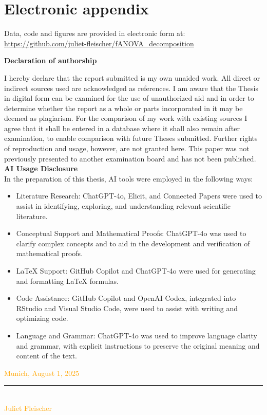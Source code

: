 \documentclass[12pt]{article}
\begin{document}
\section{Electronic appendix}
\label{el_app}

Data, code and figures are provided in electronic form at:\\
\url{https://github.com/juliet-fleischer/fANOVA_decomposition}


\newpage
    



\Large
\noindent
\textbf{Declaration of authorship} 
\vspace{0.5cm}
\noindent
\normalsize

I hereby declare that the report submitted is my own unaided work. All direct 
or indirect sources used are acknowledged as references. I am aware that the 
Thesis in digital form can be examined for the use of unauthorized aid and in 
order to determine whether the report as a whole or parts incorporated in it may 
be deemed as plagiarism. For the comparison of my work with existing sources I 
agree that it shall be entered in a database where it shall also remain after 
examination, to enable comparison with future Theses submitted. Further rights 
of reproduction and usage, however, are not granted here. This paper was not 
previously presented to another examination board and has not been published.
\\
\textbf{AI Usage Disclosure}\\
In the preparation of this thesis, AI tools were employed in the following ways:
\begin{itemize}
    \item Literature Research: ChatGPT-4o, Elicit, and Connected Papers were used to assist in identifying, exploring, and understanding relevant scientific literature.
    \item Conceptual Support and Mathematical Proofs: ChatGPT-4o was used to clarify complex concepts and to aid in the development and verification of mathematical proofs.
    \item \LaTeX{} Support: GitHub Copilot and ChatGPT-4o were used for generating and formatting \LaTeX{} formulas.
    \item Code Assistance: GitHub Copilot and OpenAI Codex, integrated into RStudio and Visual Studio Code, were used to assist with writing and optimizing code.
    \item Language and Grammar: ChatGPT-4o was used to improve language clarity and grammar, with explicit instructions to preserve the original meaning and content of the text.
\end{itemize}


\vspace{1cm}
\textcolor{orange}{Munich, August 1, 2025} \\

\vspace{3cm}

\noindent\rule{0.5\textwidth}{0.4pt} \\

\textcolor{orange}{Juliet Fleischer}

\end{document}
